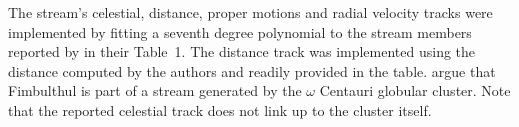 The stream's celestial, distance, proper motions and radial velocity tracks were implemented by fitting a seventh degree polynomial to the stream members reported by \citet{Ibata2021} in their Table~1. The distance track was implemented using the distance computed by the authors and readily provided in the table. \citet{Ibata2019_OCen} argue that Fimbulthul is part of a stream generated by the $\omega$ Centauri globular cluster. Note that the reported celestial track does not link up to the cluster itself.
